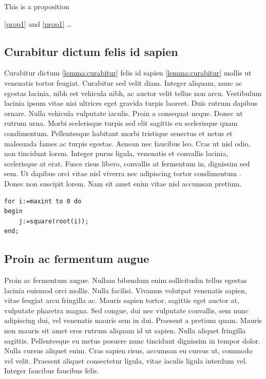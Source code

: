 \documentclass[a4paper,UKenglish,cleveref, autoref, thm-restate]{lipics-v2021}
\begin{document}
\begin{proposition}\label{prop1}
This is a proposition
\end{proposition}

\autoref{prop1} and \cref{prop1} \ldots

\subsection{Curabitur dictum felis id sapien}

Curabitur dictum \cref{lemma:curabitur} felis id sapien \autoref{lemma:curabitur} mollis ut venenatis tortor feugiat. Curabitur sed velit diam. Integer aliquam, nunc ac egestas lacinia, nibh est vehicula nibh, ac auctor velit tellus non arcu. Vestibulum lacinia ipsum vitae nisi ultrices eget gravida turpis laoreet. Duis rutrum dapibus ornare. Nulla vehicula vulputate iaculis. Proin a consequat neque. Donec ut rutrum urna. Morbi scelerisque turpis sed elit sagittis eu scelerisque quam condimentum. Pellentesque habitant morbi tristique senectus et netus et malesuada fames ac turpis egestas. Aenean nec faucibus leo. Cras ut nisl odio, non tincidunt lorem. Integer purus ligula, venenatis et convallis lacinia, scelerisque at erat. Fusce risus libero, convallis at fermentum in, dignissim sed sem. Ut dapibus orci vitae nisl viverra nec adipiscing tortor condimentum \cite{DBLP:journals/cacm/Dijkstra68a}. Donec non suscipit lorem. Nam sit amet enim vitae nisl accumsan pretium.

\begin{lstlisting}[caption={Useless code.},label=list:8-6,captionpos=t,float,abovecaptionskip=-\medskipamount]
for i:=maxint to 0 do
begin
    j:=square(root(i));
end;
\end{lstlisting}

\subsection{Proin ac fermentum augue}

Proin ac fermentum augue. Nullam bibendum enim sollicitudin tellus egestas lacinia euismod orci mollis. Nulla facilisi. Vivamus volutpat venenatis sapien, vitae feugiat arcu fringilla ac. Mauris sapien tortor, sagittis eget auctor at, vulputate pharetra magna. Sed congue, dui nec vulputate convallis, sem nunc adipiscing dui, vel venenatis mauris sem in dui. Praesent a pretium quam. Mauris non mauris sit amet eros rutrum aliquam id ut sapien. Nulla aliquet fringilla sagittis. Pellentesque eu metus posuere nunc tincidunt dignissim in tempor dolor. Nulla cursus aliquet enim. Cras sapien risus, accumsan eu cursus ut, commodo vel velit. Praesent aliquet consectetur ligula, vitae iaculis ligula interdum vel. Integer faucibus faucibus felis.
\end{document}
